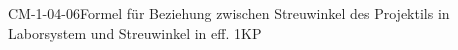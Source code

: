 
\begin{CONC}{CM-1-04-06}{Formel für Beziehung zwischen Streuwinkel des Projektils in Laborsystem und Streuwinkel in eff. 1KP}
\end{CONC}
